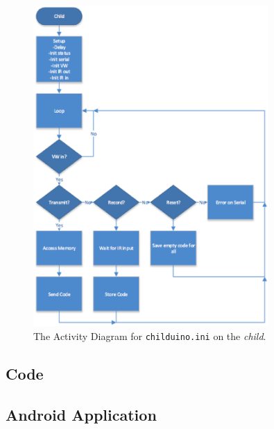 \documentclass[12pt]{article}
\begin{document}
\begin{figure}[ht!]
\centering %
\includegraphics[width=0.8\textwidth]{AD-childuino.eps} 
\caption{The Activity Diagram for \texttt{childuino.ini} on the \emph{child}. } \label{ad-childuinio}
\end{figure}

\clearpage

\subsection*{Code}
\subsection{Android Application}
 

 
 
 
 
\end{document}
